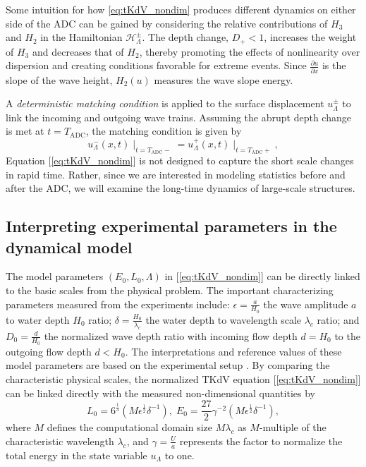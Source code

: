 \documentclass[9pt,twocolumn,twoside,lineno]{pnas-new}
\begin{document}
Some intuition for how \eqref{eq:tKdV_nondim} produces different dynamics on either side of the ADC can be gained by considering the relative contributions of $H_3$ and $H_2$ in the Hamiltonian $\mathcal{H}_{\Lambda}^{\pm}$. The depth change, $D_{+}<1$, increases the weight of $H_3$ and decreases that of $H_2$, thereby promoting the effects of nonlinearity over dispersion and creating conditions favorable for extreme events. Since $\frac{\partial u}{\partial x}$ is the slope of the wave height, $H_{2}\left(u\right)$ measures the
wave slope energy.

A \emph{deterministic matching condition} is applied to the surface displacement $u_{\Lambda}^{\pm}$ to link the incoming and outgoing wave trains. Assuming the abrupt depth change is met at $t=T_{\mathrm{ADC}}$, the matching condition is given by
\[
u_{\Lambda}^{-}\left(x,t\right)\mid_{t=T_{\mathrm{ADC}}-}=u_{\Lambda}^{+}\left(x,t\right)\mid_{t=T_{\mathrm{ADC}}+},
\]
Equation [\ref{eq:tKdV_nondim}] is not designed to capture the short
scale changes in rapid time. 
Rather, since we are interested in modeling statistics before and after the ADC, we will examine the long-time dynamics of large-scale structures.


\subsection{Interpreting experimental parameters in the dynamical model}

The model parameters $\left(E_{0},L_{0},\Lambda\right)$ in [\ref{eq:tKdV_nondim}]
can be directly linked to the basic scales from the physical problem.
The important characterizing parameters measured from the experiments
include: $\epsilon=\frac{a}{H_{0}}$ the wave amplitude $a$ to water
depth $H_{0}$ ratio; $\delta=\frac{H_{0}}{\lambda_{c}}$ the water
depth to wavelength scale $\lambda_{c}$ ratio; and $D_{0}=\frac{d}{H_{0}}$
the normalized wave depth ratio with incoming flow depth $d=H_{0}$
to the outgoing flow depth $d<H_{0}$. The interpretations and reference
values of these model parameters are based on the experimental setup
\cite{bolles2018anomalous}. By comparing the characteristic physical
scales, the normalized TKdV equation [\ref{eq:tKdV_nondim}] can be
linked directly with the measured non-dimensional quantities by
\begin{equation}
L_{0}=6^{\frac{1}{3}}\left(M\epsilon^{\frac{1}{2}}\delta^{-1}\right),\;E_{0}=\frac{27}{2}\gamma^{-2}\left(M\epsilon^{\frac{1}{2}}\delta^{-1}\right),\label{eq:params}
\end{equation}
where $M$ defines the computational domain size $M\lambda_{c}$
as $M$-multiple of the characteristic wavelength $\lambda_{c}$,
and $\gamma=\frac{U}{a}$ represents the factor to normalize the total
energy in the state variable $u_{\Lambda}$ to one. 
\end{document}
